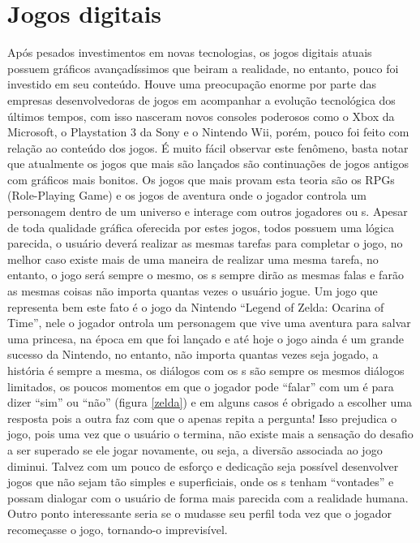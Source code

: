 \section{Jogos digitais}

Após pesados investimentos em novas tecnologias, os jogos digitais atuais possuem gráficos avançadíssimos que beiram a realidade, no entanto, pouco foi investido em seu conteúdo. Houve uma preocupação enorme por parte das empresas desenvolvedoras de jogos em acompanhar a evolução tecnológica dos últimos tempos, com isso nasceram novos consoles poderosos como o Xbox da Microsoft, o Playstation 3 da Sony e o Nintendo Wii, porém, pouco foi feito com relação ao conteúdo dos jogos. É muito fácil observar este fenômeno, basta notar que atualmente os jogos que mais são lançados são continuações de jogos antigos com gráficos mais bonitos.
Os jogos que mais provam esta teoria são os RPGs (Role-Playing Game) e os jogos de aventura onde o jogador controla um personagem dentro de um universo e  interage com outros jogadores ou \npc{}s. Apesar de toda qualidade gráfica oferecida por estes jogos, todos possuem uma lógica parecida, o usuário deverá realizar as mesmas tarefas para completar o jogo, no melhor caso existe mais de uma maneira de realizar uma mesma tarefa, no entanto, o jogo será sempre o mesmo, os \npc{}s sempre dirão as mesmas falas e farão as mesmas coisas não importa quantas vezes o usuário jogue.
Um jogo que representa bem este fato é o jogo da Nintendo ``Legend of Zelda: Ocarina of Time'', nele o jogador ontrola um personagem que vive uma aventura para salvar uma princesa, na época em que foi lançado e até hoje o jogo ainda é um grande sucesso da Nintendo, no entanto, não importa quantas vezes seja jogado, a história é sempre a mesma, os diálogos com os \npc{}s são sempre os mesmos diálogos limitados, os poucos momentos em que o jogador pode ``falar'' com um \npc{} é para dizer ``sim'' ou ``não'' (figura \ref{zelda}) e em alguns casos é obrigado a escolher uma resposta pois a outra faz com que o \npc{} apenas repita a pergunta! Isso prejudica o jogo, pois uma vez que o usuário o termina, não existe mais a sensação do desafio a ser superado se ele jogar novamente, ou seja, a diversão associada ao jogo diminui.
Talvez com um pouco de esforço e dedicação seja possível desenvolver jogos que não sejam tão simples e superficiais, onde os \npc{}s tenham ``vontades'' e possam dialogar com o usuário de forma mais parecida com a realidade humana. Outro ponto interessante seria se o \npc{} mudasse seu perfil toda vez que o jogador recomeçasse o jogo, tornando-o imprevisível.

